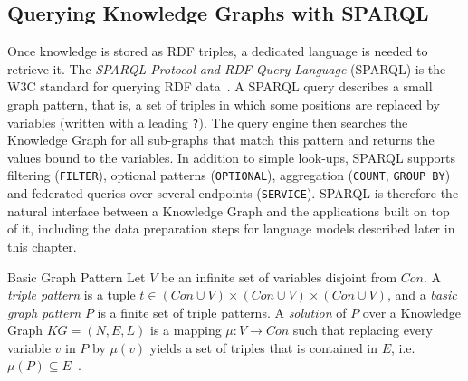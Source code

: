 
\subsection{Querying Knowledge Graphs with SPARQL}
\label{sec:bg-sparql}

Once knowledge is stored as RDF triples, a dedicated language is needed to
retrieve it. The \emph{SPARQL Protocol and RDF Query Language} (SPARQL) is
the W3C standard for querying RDF data~\cite{harris2013sparql}. A SPARQL query
describes a small graph pattern, that is, a set of triples in which some
positions are replaced by variables (written with a leading \texttt{?}). The
query engine then searches the Knowledge Graph for all sub-graphs that match
this pattern and returns the values bound to the variables. In addition to
simple look-ups, SPARQL supports filtering (\texttt{FILTER}), optional
patterns (\texttt{OPTIONAL}), aggregation (\texttt{COUNT}, \texttt{GROUP BY})
and federated queries over several endpoints (\texttt{SERVICE}). SPARQL is
therefore the natural interface between a Knowledge Graph and the
applications built on top of it, including the data preparation steps for
language models described later in this chapter.

\begin{bgdefinition}{Basic Graph Pattern}
Let $V$ be an infinite set of variables disjoint from $Con$. A \emph{triple
pattern} is a tuple $t \in (Con \cup V) \times (Con \cup V) \times (Con \cup V)$,
and a \emph{basic graph pattern} $P$ is a finite set of triple patterns.
A \emph{solution} of $P$ over a Knowledge Graph $KG=(N,E,L)$ is a mapping
$\mu : V \rightarrow Con$ such that replacing every variable $v$ in $P$ by
$\mu(v)$ yields a set of triples that is contained in $E$, i.e.\
$\mu(P) \subseteq E$~\cite{harris2013sparql,hogan2021knowledge}.
\end{bgdefinition}

